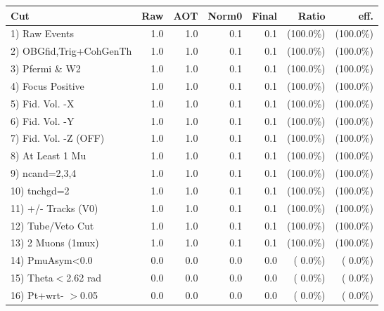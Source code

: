  \begin{table}[h!]\centering
 \begin{tabular}{||l||r|r|r|r|r|r||}
 \hline
 \hline
 Cut & Raw & AOT & Norm0 & Final & Ratio & eff.       \\
 \hline
  1) Raw Events           &          1.0 &          1.0 &          0.1 &          0.1 & (100.0\%) & (100.0\%) \\
  2) OBGfid,Trig+CohGenTh &          1.0 &          1.0 &          0.1 &          0.1 & (100.0\%) & (100.0\%) \\
  3) Pfermi \& W2         &          1.0 &          1.0 &          0.1 &          0.1 & (100.0\%) & (100.0\%) \\
  4) Focus Positive       &          1.0 &          1.0 &          0.1 &          0.1 & (100.0\%) & (100.0\%) \\
  5) Fid. Vol. -X         &          1.0 &          1.0 &          0.1 &          0.1 & (100.0\%) & (100.0\%) \\
  6) Fid. Vol. -Y         &          1.0 &          1.0 &          0.1 &          0.1 & (100.0\%) & (100.0\%) \\
  7) Fid. Vol. -Z (OFF)   &          1.0 &          1.0 &          0.1 &          0.1 & (100.0\%) & (100.0\%) \\
  8) At Least 1 Mu        &          1.0 &          1.0 &          0.1 &          0.1 & (100.0\%) & (100.0\%) \\
  9) ncand=2,3,4          &          1.0 &          1.0 &          0.1 &          0.1 & (100.0\%) & (100.0\%) \\
 10) tnchgd=2             &          1.0 &          1.0 &          0.1 &          0.1 & (100.0\%) & (100.0\%) \\
 11) +/- Tracks (V0)      &          1.0 &          1.0 &          0.1 &          0.1 & (100.0\%) & (100.0\%) \\
 12) Tube/Veto Cut        &          1.0 &          1.0 &          0.1 &          0.1 & (100.0\%) & (100.0\%) \\
 13) 2 Muons (1mux)       &          1.0 &          1.0 &          0.1 &          0.1 & (100.0\%) & (100.0\%) \\
 14) PmuAsym<0.0          &          0.0 &          0.0 &          0.0 &          0.0 & (  0.0\%) & (  0.0\%) \\
 15) Theta$<$2.62 rad     &          0.0 &          0.0 &          0.0 &          0.0 & (  0.0\%) & (  0.0\%) \\
 16) Pt+wrt- $>$0.05      &          0.0 &          0.0 &          0.0 &          0.0 & (  0.0\%) & (  0.0\%) \\

\end{tabular}
\end{table}
